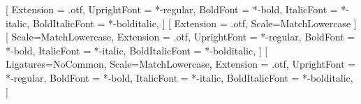 \usepackage[english]{babel}

\usepackage{amsmath,amssymb,amsfonts}
\usepackage[utf8]{inputenc}

\usepackage{fontspec}
\usepackage{unicode-math}
\setmainfont{texgyretermes}[
	Extension = .otf,
	UprightFont = *-regular,
	BoldFont = *-bold,
	ItalicFont = *-italic,
	BoldItalicFont = *-bolditalic,
]
[
	Extension = .otf,
	Scale=MatchLowercase
]
\setsansfont{texgyreheros}[
	Scale=MatchLowercase,
	Extension = .otf,
	UprightFont = *-regular,
	BoldFont = *-bold,
	ItalicFont = *-italic,
	BoldItalicFont = *-bolditalic,
]
\setmonofont{texgyrecursor}[
	Ligatures=NoCommon,
	Scale=MatchLowercase,
	Extension = .otf,
	UprightFont = *-regular,
	BoldFont = *-bold,
	ItalicFont = *-italic,
	BoldItalicFont = *-bolditalic,
]

\usepackage{lastpage}

\usepackage{gensymb}

\usepackage{setspace}

\usepackage{ccicons}

\usepackage[hang,flushmargin]{footmisc}

\usepackage{geometry}

\setlength{\parindent}{0pt}
\setlength{\parskip}{6pt plus 2pt minus 1pt}

\usepackage{fancyhdr}
\renewcommand{\headrulewidth}{0pt}